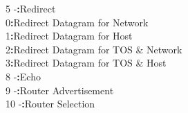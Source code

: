 \documentclass[a4paper,12pt]{article}
\begin{document}
\begin{figure}[H]
			\hspace{8.7mm}5 \hspace{2mm}			-\hspace{9mm}\textbf{:}\hspace{2.2mm}Redirect\\
			\hspace{8.7mm} \hspace{3.6mm}			0\hspace{8.8mm}\textbf{:}\hspace{2.2mm}Redirect Datagram for Network\\
			\hspace{8.7mm} \hspace{3.6mm}			1\hspace{8.8mm}\textbf{:}\hspace{2.2mm}Redirect Datagram for Host\\
			\hspace{8.7mm} \hspace{3.6mm}			2\hspace{8.8mm}\textbf{:}\hspace{2.2mm}Redirect Datagram for TOS \& Network\\
			\hspace{8.7mm} \hspace{3.6mm}			3\hspace{8.8mm}\textbf{:}\hspace{2.2mm}Redirect Datagram for TOS \& Host\\
			\fi
			\hspace{8.7mm}8 \hspace{2mm}			-\hspace{8.9mm}\textbf{:}\hspace{2.4mm}Echo\\
			\iffalse
			\hspace{8.7mm}9 \hspace{2mm}			-\hspace{8.9mm}\textbf{:}\hspace{2.4mm}Router Advertisement\\
			
			\hspace{6.7mm}10 \hspace{2mm}			-\hspace{8.9mm}\textbf{:}\hspace{2.4mm}Router Selection\\
			

\end{figure}
\end{document}
